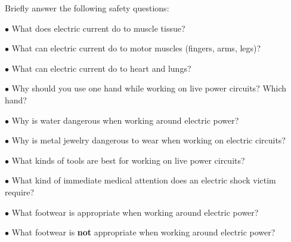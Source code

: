

Briefly answer the following safety questions:

\medskip
\item{$\bullet$} What does electric current do to muscle tissue?
\item{$\bullet$} What can electric current do to motor muscles (fingers, arms, legs)?
\item{$\bullet$} What can electric current do to heart and lungs?
\item{$\bullet$} Why should you use one hand while working on live power circuits?  Which hand?
\item{$\bullet$} Why is water dangerous when working around electric power?
\item{$\bullet$} Why is metal jewelry dangerous to wear when working on electric circuits?
\item{$\bullet$} What kinds of tools are best for working on live power circuits?
\item{$\bullet$} What kind of immediate medical attention does an electric shock victim require?
\item{$\bullet$} What footwear is appropriate when working around electric power?
\item{$\bullet$} What footwear is {\bf not} appropriate when working around electric power?
\medskip







